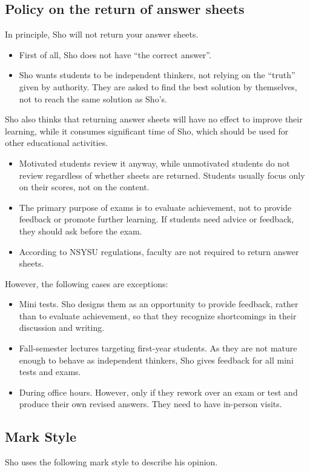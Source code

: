 \documentclass[11pt,pdfa,lastpage,minititle]{MishoNote}
\begin{document}
\subsection*{Policy on the return of answer sheets}
In principle, Sho will not return your answer sheets.
\begin{itemize}
  \item First of all, Sho does not have ``the correct answer''.
  \item Sho wants students to be independent thinkers, not relying on the ``truth'' given by authority.
        They are asked to find the best solution by themselves, not to reach the same solution as Sho's.
\end{itemize}
Sho also thinks that returning answer sheets will have no effect to improve their learning, while it consumes significant time of Sho, which should be used for other educational activities.
\begin{itemize}
  \item Motivated students review it anyway, while unmotivated students do not review regardless of whether sheets are returned. Students usually focus only on their scores, not on the content.
  \item The primary purpose of exams is to evaluate achievement, not to provide feedback or promote further learning. If students need advice or feedback, they should ask before the exam.
  \item According to NSYSU regulations, faculty are not required to return answer sheets.
\end{itemize}
 However, the following cases are exceptions:
\begin{itemize}
  \item Mini tests. Sho designs them as an opportunity to provide feedback, rather than to evaluate achievement, so that they recognize shortcomings in their discussion and writing.
  \item Fall-semester lectures targeting first-year students. As they are not mature enough to behave as independent thinkers, Sho gives feedback for all mini tests and exams.
  \item During office hours. However, only if they rework over an exam or test and produce their own revised answers. They need to have in-person visits.
\end{itemize}

\subsection*{Mark Style}
Sho uses the following mark style to describe his opinion.
\end{document}
